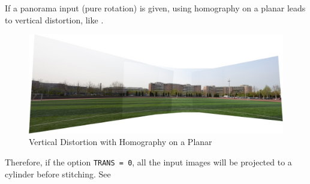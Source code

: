 \begin{enumerate}
If a panorama input (pure rotation) is given, using homography on a planar leads to vertical distortion, like .
\begin{figure}[H]
  \centering
  \includegraphics[width=1.0\textwidth]{res/distort.png}
  \caption{Vertical Distortion with Homography on a Planar\label{fig:distort}}
\end{figure}

Therefore, if the option \verb|TRANS = 0|, all the input images will be projected to a cylinder before stitching. See 
\end{enumerate}

